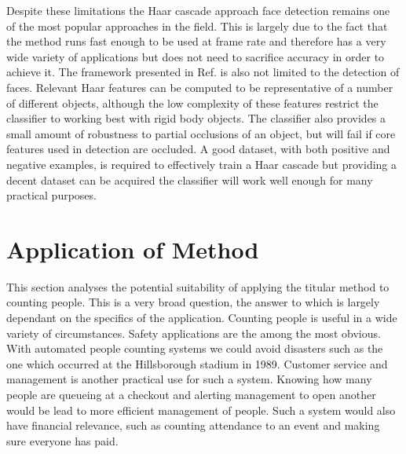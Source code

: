 \documentclass[conference]{IEEEtran}
\begin{document}
Despite these limitations the Haar cascade approach face detection remains one of the most popular approaches in the field. This is largely due to the fact that the method runs fast enough to be used at frame rate and therefore has a very wide variety of applications but does not need to sacrifice accuracy in order to achieve it. The framework presented in Ref. \cite{viola2004robust} is also not limited to the detection of faces. Relevant Haar features can be computed to be representative of a number of different objects, although the low complexity of these features restrict the classifier to working best with rigid body objects. The classifier also provides a small amount of robustness to partial occlusions of an object, but will fail if core features used in detection are occluded. A good dataset, with both positive and negative examples, is required to effectively train a Haar cascade but providing  a decent dataset can be acquired the classifier will work well enough for many practical purposes.

\section{Application of Method} \label{sec:application-of-method}
This section analyses the potential suitability of applying the titular method to counting people. This is a very broad question, the answer to which is largely dependant on the specifics of the application. Counting people is useful in a wide variety of circumstances. Safety applications are the among the most obvious. With automated people counting systems we could avoid disasters such as the one which occurred at the Hillsborough stadium in 1989. Customer service and management is another practical use for such a system. Knowing how many people are queueing at a checkout and alerting management to open another would be lead to more efficient management of people. Such a system would also have financial relevance, such as counting attendance to an event and making sure everyone has paid. 
\end{document}
